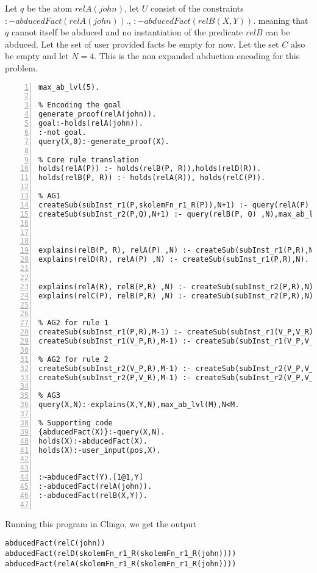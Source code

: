 \documentclass[sigconf]{acmart}
\begin{document}
Let $q$ be the atom $relA(john)$, let $U$ consist of the constraints $:-abducedFact(relA(john)).$, $:-abducedFact(relB(X,Y)).$ meaning that $q$ cannot itself be abduced and no instantiation of the predicate $relB$ can be abduced. Let the set of user provided facts be empty for now. Let the set $C$ also be empty and let $N = 4$. This is the non expanded abduction encoding for this problem. 
\begin{lstlisting}[numbers=left]
max_ab_lvl(5).

% Encoding the goal
generate_proof(relA(john)).
goal:-holds(relA(john)).
:-not goal.
query(X,0):-generate_proof(X).

% Core rule translation
holds(relA(P)) :- holds(relB(P, R)),holds(relD(R)).
holds(relB(P, R)) :- holds(relA(R)), holds(relC(P)).

% AG1
createSub(subInst_r1(P,skolemFn_r1_R(P)),N+1) :- query(relA(P) ,N),max_ab_lvl(M),N<M-1.
createSub(subInst_r2(P,Q),N+1) :- query(relB(P, Q) ,N),max_ab_lvl(M),N<M-1.



explains(relB(P, R), relA(P) ,N) :- createSub(subInst_r1(P,R),N).
explains(relD(R), relA(P) ,N) :- createSub(subInst_r1(P,R),N).


explains(relA(R), relB(P,R) ,N) :- createSub(subInst_r2(P,R),N).
explains(relC(P), relB(P,R) ,N) :- createSub(subInst_r2(P,R),N).


% AG2 for rule 1
createSub(subInst_r1(P,R),M-1) :- createSub(subInst_r1(V_P,V_R),N), holds(relB(P, R)),max_ab_lvl(M).
createSub(subInst_r1(V_P,R),M-1) :- createSub(subInst_r1(V_P,V_R),N), holds(relD(R)),max_ab_lvl(M).

% AG2 for rule 2
createSub(subInst_r2(V_P,R),M-1) :- createSub(subInst_r2(V_P,V_R),N), holds(relA(R)),max_ab_lvl(M).
createSub(subInst_r2(P,V_R),M-1) :- createSub(subInst_r2(V_P,V_R),N), holds(relC(P)),max_ab_lvl(M).

% AG3
query(X,N):-explains(X,Y,N),max_ab_lvl(M),N<M.

% Supporting code
{abducedFact(X)}:-query(X,N).
holds(X):-abducedFact(X).
holds(X):-user_input(pos,X).


:~abducedFact(Y).[1@1,Y]
:-abducedFact(relA(john)).
:-abducedFact(relB(X,Y)).


\end{lstlisting}
Running this program in Clingo, we get the output 
\begin{verbatim}
abducedFact(relC(john))
abducedFact(relD(skolemFn_r1_R(skolemFn_r1_R(john))))
abducedFact(relA(skolemFn_r1_R(skolemFn_r1_R(john))))    
\end{verbatim}
\end{document}
